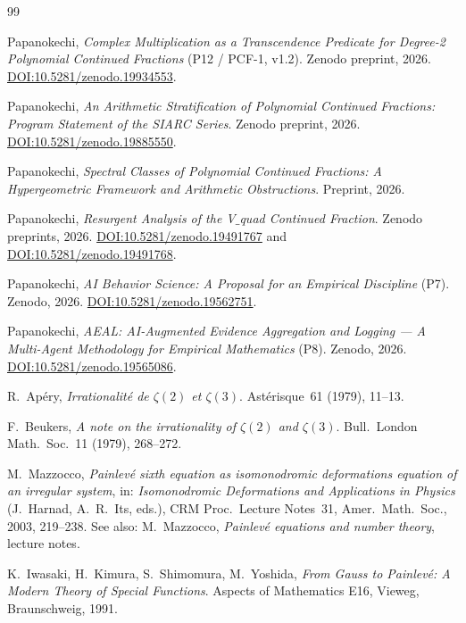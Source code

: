 \documentclass[11pt,a4paper]{article}
\theoremstyle{definition}
\theoremstyle{remark}
\begin{document}
\begin{thebibliography}{99}

Papanokechi, \emph{Complex Multiplication as a Transcendence Predicate
for Degree-2 Polynomial Continued Fractions} (P12 / PCF-1, v1.2).
Zenodo preprint, 2026.
\href{https://doi.org/10.5281/zenodo.19934553}
{DOI:10.5281/zenodo.19934553}.

Papanokechi, \emph{An Arithmetic Stratification of Polynomial Continued
Fractions: Program Statement of the SIARC Series}.
Zenodo preprint, 2026.
\href{https://doi.org/10.5281/zenodo.19885550}
{DOI:10.5281/zenodo.19885550}.

Papanokechi, \emph{Spectral Classes of Polynomial Continued Fractions:
A Hypergeometric Framework and Arithmetic Obstructions}.
Preprint, 2026.

Papanokechi, \emph{Resurgent Analysis of the V$\_$quad Continued
Fraction}.
Zenodo preprints, 2026.
\href{https://doi.org/10.5281/zenodo.19491767}
{DOI:10.5281/zenodo.19491767} and
\href{https://doi.org/10.5281/zenodo.19491768}
{DOI:10.5281/zenodo.19491768}.

Papanokechi, \emph{AI Behavior Science: A Proposal for an Empirical
Discipline} (P7). Zenodo, 2026.
\href{https://doi.org/10.5281/zenodo.19562751}
{DOI:10.5281/zenodo.19562751}.

Papanokechi, \emph{AEAL: AI-Augmented Evidence Aggregation and
Logging --- A Multi-Agent Methodology for Empirical Mathematics} (P8).
Zenodo, 2026.
\href{https://doi.org/10.5281/zenodo.19565086}
{DOI:10.5281/zenodo.19565086}.

R.~Ap\'ery, \emph{Irrationalit\'e de $\zeta(2)$ et $\zeta(3)$}.
Ast\'erisque~61 (1979), 11--13.

F.~Beukers, \emph{A note on the irrationality of $\zeta(2)$ and
$\zeta(3)$}. Bull.~London Math.~Soc.~11 (1979), 268--272.

M.~Mazzocco, \emph{Painlev\'e sixth equation as isomonodromic deformations
equation of an irregular system}, in: \emph{Isomonodromic Deformations and
Applications in Physics} (J.~Harnad, A.~R.~Its, eds.),
CRM Proc.~Lecture Notes~31, Amer.~Math.~Soc., 2003, 219--238.
See also: M.~Mazzocco, \emph{Painlev\'e equations and number theory},
lecture notes.

K.~Iwasaki, H.~Kimura, S.~Shimomura, M.~Yoshida,
\emph{From Gauss to Painlev\'e: A Modern Theory of Special Functions}.
Aspects of Mathematics E16, Vieweg, Braunschweig, 1991.


\end{thebibliography}
\end{document}
